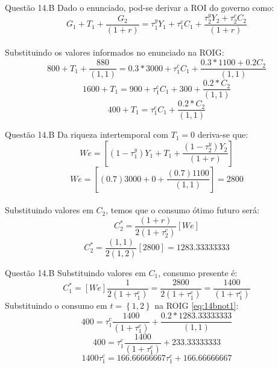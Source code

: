 \documentclass[aspectratio=169]{beamer}
\begin{document}
\begin{frame}{Questão 14.B}
Dado o enunciado, pod-se derivar a ROI do governo como:
\begin{equation}
    G_1+T_1+\frac{G_2}{(1+r)}=\tau_1^y Y_1 + \tau_1^c C_1 + \frac{\tau_2^y Y_2 + \tau_2^c C_2}{(1+r)}
\end{equation}
\\
Substituindo os valores informados no enunciado na ROIG:
\begin{equation}
    800+T_1+\frac{880}{(1,1)}= 0.3 * 3000 + \tau_1^c C_1 + \frac{0.3 *1100 + 0.2 C_2}{(1,1)}
\end{equation}
\begin{equation}
    1600+T_1= 900 + \tau_1^c C_1 + 300 +\frac{0.2*C_2}{(1,1)}
\end{equation}
\begin{equation}\label{eq:14bnot1}
    400 +T_1 = \tau_1^c C_1 + \frac{0.2*C_2}{(1,1)}
\end{equation}
\end{frame}

\begin{frame}{Questão 14.B}
Da riqueza intertemporal com $T_1=0$ deriva-se que:
\begin{equation}
    We=\left[(1-\tau_1^y)Y_1 + T_1 + \frac{(1-\tau_2^y)Y_2}{(1+r)}\right]
\end{equation}
\begin{equation}
    We=\left[(0.7)3000 + 0 + \frac{(0.7)1100}{(1,1)}\right] = 2800
\end{equation}
\\
Substituindo valores em $C_2$, temos que o consumo ótimo futuro será:
\begin{equation}
    C_2^* = \frac{(1+r)}{2(1+\tau_2^c)}\left[We\right]
\end{equation}
\begin{equation}
    C_2^* = \frac{(1,1)}{2(1,2)}\left[2800\right]=1283.33333333
\end{equation}
\end{frame}

\begin{frame}{Questão 14.B}
Substituindo valores em $C_1$, consumo presente é:
\begin{equation}
    C_1^* = \left[We\right]\frac{1}{2(1+\tau_1^c)} = \frac{2800}{2(1+\tau_1^c)}=\frac{1400}{(1+\tau_1^c)}
\end{equation}
Substituindo o consumo em $t=\left\{1,2\right\}$ na ROIG \eqref{eq:14bnot1}:
\begin{equation}
    400 = \tau_1^c \frac{1400}{(1+\tau_1^c)} + \frac{0.2*1283.33333333}{(1,1)}
\end{equation}
\begin{equation}
    400 = \tau_1^c \frac{1400}{(1+\tau_1^c)} + 233.33333333
\end{equation}
\begin{equation}
    1400\tau_1^c = 166.66666667\tau_1^c + 166.66666667
\end{equation}
\end{frame}
\end{document}
